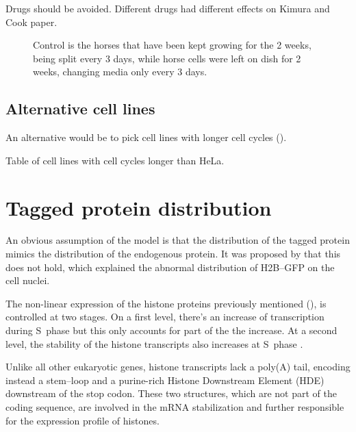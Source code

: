     Drugs should be avoided. Different drugs had different effects on Kimura and Cook paper.

    \begin{figure}
      \centering
                   {Control is the horses that have been kept growing for the 2 weeks,
                    being split every 3 days, while horse cells were left on dish for
                    2 weeks, changing media only every 3 days.}
    \end{figure}

  \subsection{Alternative cell lines}
  
    An alternative would be to pick cell lines with longer cell cycles ().
    
    \begin{table}
      \caption{Table of cell lines with cell cycles longer than HeLa.}
      \label{tab:alternative-cells}
    \end{table}


\section{Tagged protein distribution}
  An obvious assumption of the model is that the distribution of the tagged protein mimics
  the distribution of the endogenous protein. It was proposed by  that
  this does not hold, which explained the abnormal distribution of H2B--GFP on the cell nuclei.

  The non-linear expression of the histone proteins previously mentioned (),
  is controlled at two stages. On a first level, there's an increase of transcription during S~phase
  but this only accounts for part of the the increase. At a second level, the stability of the histone
  transcripts also increases at S~phase .
  
  Unlike all other eukaryotic genes, histone transcripts lack a poly(A) tail, encoding instead a
  stem--loop and a purine-rich Histone Downstream Element (HDE) downstream of the stop codon.
  These two structures, which are not part of the coding sequence, are involved in the
  mRNA stabilization and further responsible for the expression profile of histones.
  
